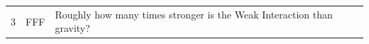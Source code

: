 \documentclass[10pt]{article}
\begin{document}
\begin{tiny}
\begin{longtable}{|r|p{0.375in}|p{1.275in}|p{3.5in}|}
3  &          FFF &                                                                                                                                                                                                            Roughly how many times stronger is the Weak Interaction than gravity? &                                                                                                                                                                                                                                                                                                                                                                                                                                                                                                                                                                                                                                                                                                                                                                                                                                                                                                                                                                                                                                                                                                                                                                                                                                                                                                                                                                                                                                                                                                                                                                                                                                                                                                                                                                                                                                                                                                                                                                                                                                                                                                                                                                                                                                                                                                                                                                                                                                                                                                                                                                                                                                                                                                                                                                                                                                                                                                                                                                                                                                                                                               
\end{longtable}
\end{tiny}
\end{document}
